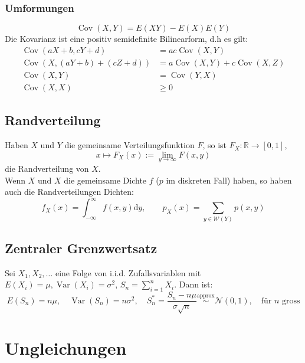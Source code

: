 \documentclass[a4paper,titlepage]{article}
\DeclareMathOperator{\Var}{Var}
\DeclareMathOperator{\Cov}{Cov}
\renewcommand{\d}{\mathrm{d}}
\begin{document}
\subsubsection{Umformungen}
\begin{equation*}
\Cov(X,Y) = E(XY) - E(X)E(Y)
\end{equation*}
Die Kovarianz ist eine positiv semidefinite Bilinearform, d.h es gilt:
\begin{align*}
\Cov(aX +b, cY + d) &= ac\Cov(X,Y) \\
\Cov(X,(aY + b) + (cZ + d)) &= a\Cov(X,Y) + c \Cov(X,Z) \\
\Cov(X,Y) &= \Cov(Y,X) \\
\Cov(X,X) &\geq 0
\end{align*}

\subsection{Randverteilung}
Haben $X$ und $Y$ die gemeinsame Verteilungsfunktion $F$, so ist $F_X: \mathbb{R} \to [0,1]$,
\begin{equation*}
x \mapsto F_X(x) := \lim_{y \to \infty} F(x,y)
\end{equation*}
die Randverteilung von $X$. \\[0.5em]
Wenn $X$ und $X$ die gemeinsame Dichte $f$ ($p$ im diskreten Fall) haben, so haben auch die Randverteilungen Dichten:
\begin{equation*}
f_X(x) = \int_{-\infty}^{\infty}f(x,y) \d y, \qquad p_X(x) = \sum_{y \in \mathcal{W}(Y)} p(x,y)
\end{equation*}

\subsection{Zentraler Grenzwertsatz}
Sei $X_1, X_2, \dots$ eine Folge von i.i.d. Zufallsvariablen mit $E(X_i) = \mu, \Var(X_i) = \sigma ^2$, $S_n = \sum_{i=1}^n X_i$. Dann ist:
\begin{equation*}
E(S_n) = n\mu, \quad \Var(S_n) = n\sigma^2, \quad S_n^* = \frac{S_n - n \mu}{\sigma \sqrt{n}} \overset{\text{approx}}{\sim} \mathcal{N}(0,1), \quad \text{für $n$ gross}
\end{equation*}

\section{Ungleichungen}
\end{document}
